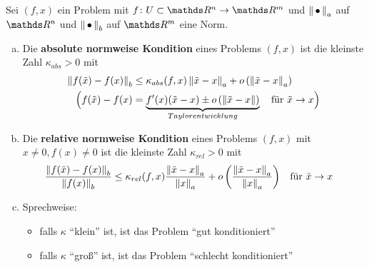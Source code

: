 


\begin{Defe}\label{3.2.7}
  Sei $(f,x)$ ein Problem mit $f\colon U\subset \R^n \to \R^m$
  und $\nn_a$ auf $\R^n$ und $\nn_b$ auf $\R^m$ eine Norm.
  \begin{enumerate}[a)]
  \item Die \textbf{absolute normweise
      Kondition} 
    eines Problems $(f,x)$ ist die kleinste Zahl 
    $\kappa _{abs} > 0 $ mit
    \begin{align}
      \nn[f(\tilde{x})-f(x)]_b 
      &\leq \kappa_{abs}(f,x) \nn[\tilde{x}-x]_a
        + o\left(\nn[\tilde{x}-x]_a\right) 
        \label{III.2.2} \\\nonumber
      \Bigl(f(\tilde{x})- f(x) 
      &=\underbrace{f'(x)(\tilde{x}-x)
        \pm o\left(\nn[\tilde{x}-x]\right)}_{Taylorentwicklung}
        \quad \text{für }\tilde{x}\to x \Bigr)
    \end{align}
  \item Die \textbf{relative normweise
      Kondition} 
    eines Problems $(f,x)$  mit $x\neq 0, f(x) \neq 0$
    ist die kleinste Zahl 
    $\kappa _{rel} > 0 $ mit
    \begin{align}
      \frac{\nn[f(\tilde{x})-f(x)]_b}{\nn[f(x)]_b}
      &\leq \kappa _{rel}(f,x)\frac{\nn[\tilde{x}-x]_a}{\nn[x]_a}
        + o\left(\frac{\nn[\tilde{x}-x]_a}{\nn[x]_a}\right) \label{III.2.3}
      &&	\text{für } \tilde{x} \to x
    \end{align}
  \item Sprechweise:
    \begin{itemize}
    \item falls $\kappa$ \enquote{klein} ist,
      ist das Problem \enquote{gut konditioniert}
    \item falls $\kappa$ \enquote{groß} ist, 
      ist das Problem \enquote{schlecht konditioniert}
    \end{itemize}
  \end{enumerate}
\end{Defe}

